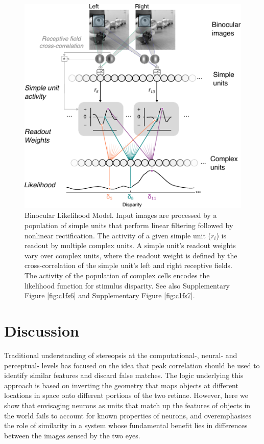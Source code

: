 \begin{figure}[!h]
  \centering
  \includegraphics{chapter1/chapter1-figs/Fig7.pdf}
  \caption[Binocular Likelihood Model.]{Binocular Likelihood Model. Input images are processed by a population of simple units that perform linear filtering followed by nonlinear rectification. The activity of a given simple unit ($r_i$) is readout by multiple complex units. A simple unit's readout weights vary over complex units, where the readout weight is defined by the cross-correlation of the simple unit's left and right receptive fields. The activity of the population of complex cells encodes the likelihood function for stimulus disparity. See also Supplementary Figure \ref{fig:c1fs6} and Supplementary Figure \ref{fig:c1fs7}.}
  \label{fig:c1f7}
\end{figure}


\section{Discussion}

Traditional understanding of stereopsis at the computational-, neural- and perceptual- levels has focused on the idea that peak correlation should be used to identify similar features and discard false matches. The logic underlying this approach is based on inverting the geometry that maps objects at different locations in space onto different portions of the two retinae. However, here we show that envisaging neurons as units that match up the features of objects in the world fails to account for known properties of neurons, and overemphasises the role of similarity in a system whose fundamental benefit lies in differences between the images sensed by the two eyes. 

